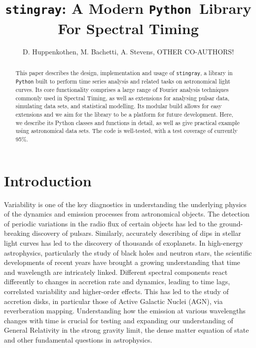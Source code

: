 \documentclass[12pt]{emulateapj}
\newcommand{\stingray}{\texttt{stingray}\xspace}
\newcommand{\python}{\texttt{Python}\xspace}
\begin{document}
\title{\stingray: A Modern \python\ Library For Spectral Timing}

\author{D. Huppenkothen, M. Bachetti, A. Stevens\altaffilmark{}, OTHER CO-AUTHORS!}
 


\begin{abstract}
This paper describes the design, implementation and usage of \stingray, a library in \python built to perform time series analysis and related tasks on astronomical light curves. 
Its core functionality comprises a large range of Fourier analysis techniques commonly used in Spectral Timing, as well as extensions for analysing pulsar data, simulating data sets, and statistical modelling. 
Its modular build allows for easy extensions and we aim for the library to be a platform for future development. 
Here, we describe its Python classes and functions in detail, as well as give practical example using astronomical data sets. 
The code is well-tested, with a test coverage of currently 95\%.

\end{abstract}


\section{Introduction}

Variability is one of the key diagnostics in understanding the underlying physics of the dynamics and emission processes from astronomical objects. 
The detection of periodic variations in the radio flux of certain objects has led to the ground-breaking discovery of pulsars. Similarly, accurately describing of dips in stellar light curves has led to the discovery of thousands of exoplanets. 
In high-energy astrophysics, particularly the study of black holes and neutron stars, the scientific developments of recent years have brought a growing understanding that time and wavelength are intricately linked. 
Different spectral components react differently to changes in accretion rate and dynamics, leading to time lags, correlated variability and higher-order effects. 
This has led to the study of accretion disks, in particular those of Active Galactic Nuclei (AGN), via reverberation mapping. 
Understanding how the emission at various wavelengths changes with time is crucial for testing and expanding our understanding of General Relativity in the strong gravity limit, the dense matter equation of state and other fundamental questions in astrophysics.
\end{document}
